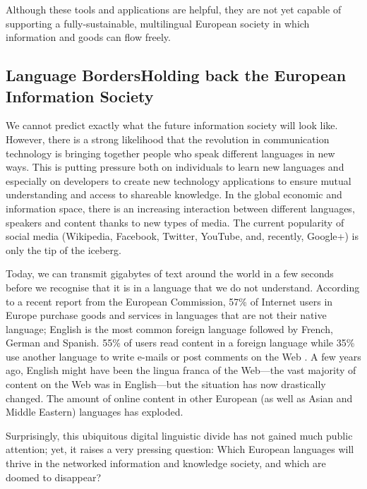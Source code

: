 \documentclass[]{../metanetpaper}
\begin{document}
\begin{multicols}{2}
Although these tools and applications are helpful, they are not yet capable of supporting a fully-sustainable, multilingual European society in which information and goods can flow freely.

\subsection[Language Borders Holding back the European Information Society]{Language Borders\newline Holding back the European Information Society}

We cannot predict exactly what the future information society will look like. However, there is a strong likelihood that the revolution in communication technology is bringing together people who speak different languages in new ways. This is putting pressure both on individuals to learn new languages and especially on developers to create new technology applications to ensure mutual understanding and access to shareable knowledge. In the global economic and information space, there is an increasing interaction between different languages, speakers and content thanks to new types of media. The current popularity of social media (Wikipedia, Facebook, Twitter, YouTube, and, recently, Google+) is only the tip of the iceberg.


Today, we can transmit gigabytes of text around the world in a few seconds before we recognise that it is in a language that we do not understand. According to a recent report from the European Commission, 57\% of Internet users in Europe purchase goods and services in languages that are not their native language; English is the most common foreign language followed by French, German and Spanish. 55\% of users read content in a foreign language while 35\% use another language to write e-mails or post comments on the Web \cite{EC1}. A few years ago, English might have been the lingua franca of the Web—the vast majority of content on the Web was in English—but the situation has now drastically changed. The amount of online content in other European (as well as Asian and Middle Eastern) languages has exploded.

Surprisingly, this ubiquitous digital linguistic divide has not gained much public attention; yet, it raises a very pressing question: Which European languages will thrive in the networked information and knowledge society, and which are doomed to disappear?


\end{multicols}
\end{document}
